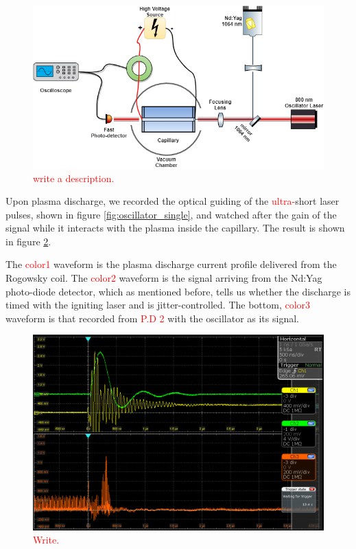 \documentclass[justified,nofonts,nobib]{tufte-book}
\begin{document}
\begin{figure}
\centering
		    \includegraphics[width=\textwidth]{figures/oscillator.png}
		    \caption{\textcolor{red}{write a description.}}
		    \label{fig:oscillator}
\end{figure}
Upon plasma discharge, we recorded the optical guiding of the \textcolor{red}{ultra-}short laser pulses, shown in figure  \ref{fig:oscillator_single}, and watched after the gain of the signal while it interacts with the plasma inside the capillary. The result is shown in figure \ref{fig:oscillator_gain}.

The \textcolor{red}{color1} waveform is the plasma discharge current profile delivered from the Rogowsky coil. The \textcolor{red}{color2} waveform is the signal arriving from the Nd:Yag photo-diode detector, which as mentioned before, tells us whether the discharge is timed with the igniting laser and is jitter-controlled. The bottom, \textcolor{red}{color3} waveform is that recorded from \textcolor{red}{P.D 2} with the oscillator as its signal.
\begin{figure}
    \centering
    \includegraphics[width=\textwidth]{figures/gain.PNG}
    \caption{\textcolor{red}{Write.}}
    \label{fig:oscillator_gain}
\end{figure}
\end{document}
